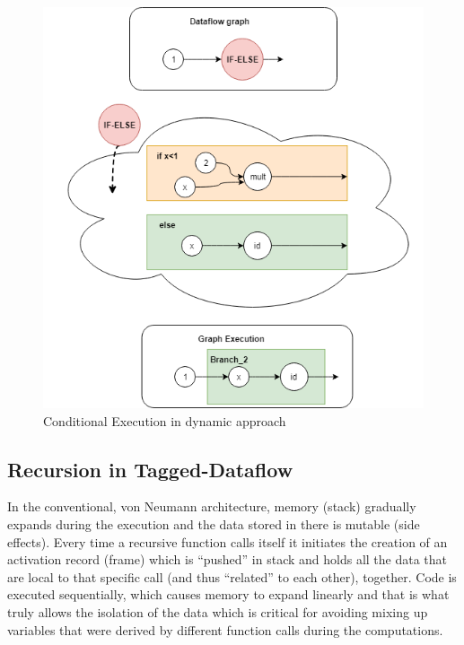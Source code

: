 \documentclass[ack,preface]{dithesis}
\begin{document}
\begin{figure}
\centering
\includegraphics[scale=0.69]{figures/ifelse}
\caption{ Conditional Execution in dynamic approach}
\end{figure}


    \subsection{Recursion in Tagged-Dataflow}

In the conventional, von Neumann architecture, memory (stack) gradually expands during the execution and the data stored in there is mutable (side effects). 
Every time a  recursive function calls itself it initiates the creation of an activation record (frame) which is “pushed” in stack and holds all the data that are local to that specific call (and thus “related” to each other), together. Code is executed sequentially, which causes memory to expand linearly and that is what truly allows the isolation of the data which is critical for avoiding mixing up variables that were derived by different function calls during the computations.
\end{document}
